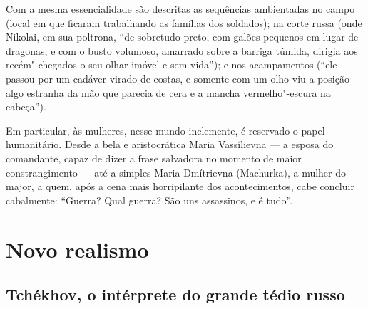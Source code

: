 Com a mesma essencialidade são descritas as sequências ambientadas no
campo (local em que ficaram trabalhando as famílias dos soldados); na
corte russa (onde Nikolai, em sua poltrona, ``de sobretudo preto, com
galões pequenos em lugar de dragonas, e com o busto volumoso, amarrado
sobre a barriga túmida, dirigia aos recém"-chegados o seu olhar imóvel e
sem vida''); e nos acampamentos (``ele passou por um cadáver virado de
costas, e somente com um olho viu a posição algo estranha da mão que
parecia de cera e a mancha vermelho"-escura na cabeça'').

Em particular, às mulheres, nesse mundo inclemente, é reservado o papel
humanitário. Desde a bela e aristocrática Maria Vassílievna --- a esposa
do comandante, capaz de dizer a frase salvadora no momento de maior
constrangimento --- até a simples Maria Dmítrievna (Machurka), a mulher
do major, a quem, após a cena mais horripilante dos acontecimentos, cabe
concluir cabalmente: ``Guerra? Qual guerra? São uns assassinos, e é
tudo''.

\part{Novo realismo}

\chapter{Tchékhov, o intérprete do grande tédio russo}

